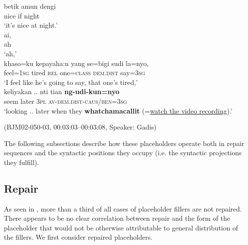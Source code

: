\documentclass[output=paper,colorlinks,citecolor=brown
\ChapterDOI{10.5281/zenodo.15697585}
]{langscibook}
\begin{document}
\begin{exe}
    \ex\label{ex:place-nyo-verb} \begin{xlist}[0\quad →A:]
         \gll
        betik amun dengi \\
        nice if night \\
        \glt `it's nice at night.' \\
        \exi{2\quad \hphantom{→G:}} \gll
        ai, \\
        ah \\
        \glt `ah,' \\
        \exi{3\quad \hphantom{→G:}} \gll
        khaso=ku kepayaha:n yang se=bigi sudi la=nyo, \\
        feel=1\textsc{sg} tired \textsc{rel} one=\textsc{class} \textsc{dem.dist} say=3\textsc{sg} \\
        \glt `I feel like he's going to say, that one's tired,' \\
         \gll
        keliyakan .. nti tian \textbf{ng-udi-kun=nyo} \\
        seem {} later 3\textsc{pl} \textsc{av}-\textsc{dem.dist}-\textsc{caus/ben}=3\textsc{sg} \\
        \glt `looking .. later when they \textbf{whatchamacallit} (=\uline{watch the video recording}).' \\
    \end{xlist}
    \hfill (BJM02-050-03, 00:03:03–00:03:08, Speaker: Gadis) 
\end{exe}

The following subsections describe how these placeholders operate both in repair sequences and the syntactic positions they occupy (i.e. the syntactic projections they fulfill).

\subsection{Repair}\label{sec:Placeholders.Repair}

As seen in , more than a third of all cases of placeholder fillers are not repaired. There appears to be no clear correlation between repair and the form of the placeholder that would not be otherwise attributable to general distribution of the fillers. We first consider repaired placeholders.
\end{document}
